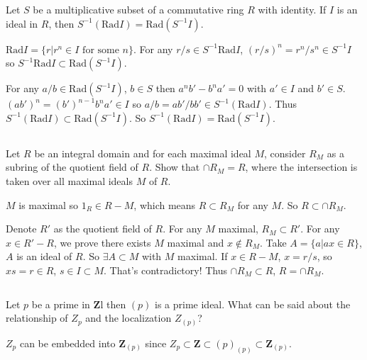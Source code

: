 $$ $$

\begin{ex}
    Let $S$ be a multiplicative subset of a commutative ring $R$ with identity. If $I$ is an ideal in $R$, then $S^{-1}(\mathrm{Rad}I)=\mathrm{Rad}(S^{-1}I)$.
\end{ex}

\begin{answer}
    $\mathrm{Rad}I=\{r|r^{n}\in I \text{ for some }n\}$. For any $r /s\in S^{-1}\mathrm{Rad}I$, $(r /s)^{n}=r^{n} /s^{n}\in S^{-1}I$ so $S^{-1}\mathrm{Rad}I\subset \mathrm{Rad}(S^{-1}I)$.

    For any $a /b\in \mathrm{Rad}(S^{-1}I)$, $b\in S$ then $a^{n}b'-b^{n}a'=0$ with $a'\in I$ and $b'\in S$. $(ab')^{n}=(b')^{n-1}b^{n}a'\in I$ so $a /b=ab'/bb'\in S^{-1}(\mathrm{Rad}I)$. Thus $S^{-1}(\mathrm{Rad}I)\subset \mathrm{Rad}(S^{-1}I)$. So $S^{-1}(\mathrm{Rad}I)=\mathrm{Rad}(S^{-1}I)$.
\end{answer}

$$ $$

\begin{ex}
    Let $R$ be an integral domain and for each maximal ideal $M$, consider $R_{M}$ as a subring of the quotient field of $R$. Show that $\cap R_{M}=R$, where the intersection is taken over all maximal ideals $M$ of $R$.
\end{ex}

\begin{answer}
    $M$ is maximal so $1_{R}\in R-M$, which means $R\subset R_{M}$ for any $M$. So $R\subset\cap R_{M}$.

    Denote $R'$ as the quotient field of $R$. For any $M$ maximal, $R_{M}\subset R'$. For any $x\in R'-R$, we prove there exists $M$ maximal and $x\notin R_{M}$. Take $A=\{a|ax\in R\}$, $A$ is an ideal of $R$. So $\exists A\subset M$ with $M$ maximal. If $x\in R-M$, $x=r /s$, so $xs=r\in R$, $s\in I\subset M$. That's contradictory! Thus $\cap R_{M}\subset R$, $R=\cap R_{M}$.
\end{answer}

$$ $$

\begin{ex}
    Let $p$ be a prime in $\mathbf{Z}$l then $(p)$ is a prime ideal. What can be said about the relationship of $Z_{p}$ and the localization $Z_{(p)}$?
\end{ex}

\begin{answer}
    $Z_{p}$ can be embedded into $\mathbf{Z}_{(p)}$ since $Z_{p}\subset \mathbf{Z}\subset (p)_{(p)}\subset \mathbf{Z}_{(p)}$.
\end{answer}

